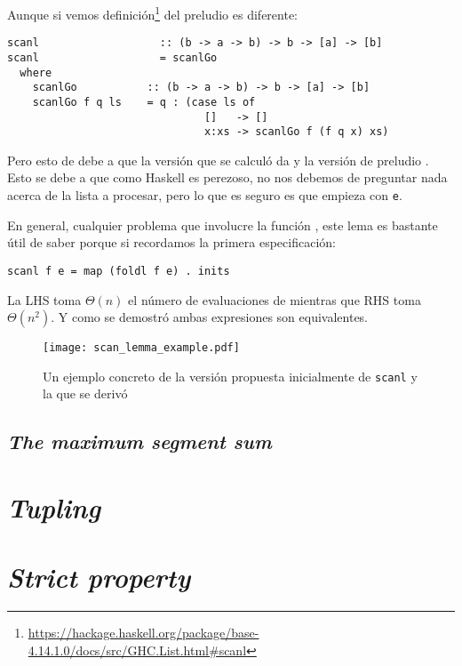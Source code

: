 Aunque si vemos definición\footnote{
\url{https://hackage.haskell.org/package/base-4.14.1.0/docs/src/GHC.List.html\#scanl}
} del preludio es diferente:
\begin{verbatim}
scanl                   :: (b -> a -> b) -> b -> [a] -> [b]
scanl                   = scanlGo
  where
    scanlGo           :: (b -> a -> b) -> b -> [a] -> [b]
    scanlGo f q ls    = q : (case ls of
                               []   -> []
                               x:xs -> scanlGo f (f q x) xs)
\end{verbatim}

Pero esto de debe a que la versión que se calculó da  y la
versión de preludio . Esto se debe a que como Haskell
es perezoso, no nos debemos de preguntar nada acerca de la lista a procesar, pero lo que es seguro
es que empieza con \texttt{e}.

En general, cualquier problema que involucre la función , este lema es bastante útil
de saber porque si recordamos la primera especificación:
\begin{verbatim}
scanl f e = map (foldl f e) . inits
\end{verbatim}

La LHS toma $\Theta(n)$ el número de evaluaciones de  mientras que RHS toma $\Theta(n^2)$.
Y como se demostró ambas expresiones son equivalentes.

\begin{figure}[h]
\caption{Un ejemplo concreto de la versión propuesta inicialmente de \texttt{scanl} y la que se derivó}
\centering
\texttt{[image: scan\_lemma\_example.pdf]}
\end{figure}

\subsection{\textit{The maximum segment sum}}

\section{\textit{Tupling}}
\section{\textit{Strict property}}